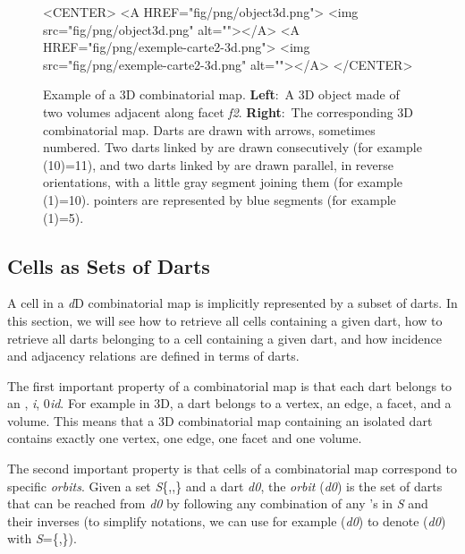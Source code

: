 \begin{figure}
\begin{ccTexOnly}
\begin{center}
    \end{center}
  \end{ccTexOnly}
  \begin{ccHtmlOnly}
    <CENTER>
    <A HREF="fig/png/object3d.png">
    <img src="fig/png/object3d.png" alt=""></A>
    <A HREF="fig/png/exemple-carte2-3d.png">
        <img src="fig/png/exemple-carte2-3d.png" alt=""></A>
    </CENTER>
    \end{ccHtmlOnly}
    \caption{Example of a 3D combinatorial map. \textbf{Left}:~A 3D object
      made of two volumes adjacent along facet \emph{f2}. \textbf{Right}:~The
      corresponding 3D combinatorial map.  Darts are drawn with
      arrows, sometimes numbered.  Two darts linked by \betaun{} are
      drawn consecutively (for example \betaun{}(10)=11), and two
      darts linked by \betadeux{} are drawn parallel, in reverse
      orientations, with a little gray segment joining them (for
      example \betadeux{}(1)=10).  \betatrois{} pointers are represented by
      blue segments (for example \betatrois{}(1)=5).}
    \label{fig-exemple-carte3d}
\end{figure}

\subsection{Cells as Sets of Darts}\label{ssec-cells-in-map}
A cell in a \emph{d}D combinatorial map is implicitly represented by a
subset of darts.
In this section, we will see how to retrieve all cells containing a
given dart, how to retrieve all darts belonging to a cell containing a
given dart, and how incidence and adjacency relations are defined in
terms of darts.

The first important property of a combinatorial map is that
each dart belongs to an , \myforall{}\emph{i}, 0\myleq{}\emph{i}\myleq{}\emph{d}.
For example in 3D, a dart belongs to a vertex, an edge, a facet, and a
volume. This means that a 3D combinatorial map containing an isolated
dart contains exactly one vertex, one edge, one facet and one volume.

The second important property is that cells of a combinatorial map
correspond to specific \emph{orbits}.  Given a set 
\emph{S}\mysubseteq{}\{\betaun{},\myldots{},\betad{}\} and a dart
\emph{d0}, the \emph{orbit} (\emph{d0}) is the set of darts that can be
reached from \emph{d0} by following any combination of any \betai{}'s in \emph{S}
and their inverses (to simplify notations, we can use for example
\orbit{\betaun{},\betaquatre{}}(\emph{d0}) to denote (\emph{d0}) with
\emph{S}=\{\betaun{},\betaquatre{}\}).

